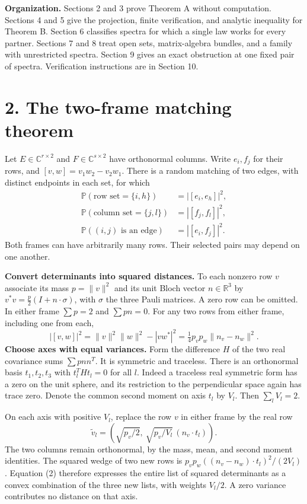 \documentclass[11pt]{article}
\newcommand{\heading}[1]{\section*{\color{ink}#1}}
\newcommand{\C}{\mathbb C}\newcommand{\R}{\mathbb R}\newcommand{\E}{\mathbb E}\newcommand{\pr}{\mathbb P}
\begin{document}
\par\textbf{Organization.} Sections 2 and 3 prove Theorem A without computation. Sections 4 and 5 give the projection, finite verification, and analytic inequality for Theorem B. Section 6 classifies spectra for which a single law works for every partner. Sections 7 and 8 treat open sets, matrix-algebra bundles, and a family with unrestricted spectra. Section 9 gives an exact obstruction at one fixed pair of spectra. Verification instructions are in Section 10.
\newpage
\heading{2. The two-frame matching theorem}
Let $E\in\C^{r\times2}$ and $F\in\C^{s\times2}$ have orthonormal columns. Write $e_i,f_j$ for their rows, and $[v,w]=v_1w_2-v_2w_1$. There is a random matching of two edges, with distinct endpoints in each set, for which
\[
 \begin{aligned}
 \pr(\text{row set}=\{i,h\})&=|[e_i,e_h]|^2,\\
 \pr(\text{column set}=\{j,l\})&=|[f_j,f_l]|^2,\\
 \pr((i,j)\text{ is an edge})&=|[e_i,f_j]|^2 .
 \end{aligned}                                                   \tag{1}
\]
Both frames can have arbitrarily many rows. Their selected pairs may depend on one another.
\par\textbf{Convert determinants into squared distances.} To each nonzero row $v$ associate its mass $p=\|v\|^2$ and its unit Bloch vector $n\in\R^3$ by $v^*v=\frac p2(I+n\cdot\sigma)$, with $\sigma$ the three Pauli matrices. A zero row can be omitted. In either frame $\sum p=2$ and $\sum pn=0$. For any two rows from either frame, including one from each,
\[
 |[v,w]|^2=\|v\|^2\|w\|^2-|vw^*|^2=\tfrac14 p_v p_w\|n_v-n_w\|^2. \tag{2}
\]
\textbf{Choose axes with equal variances.} Form the difference $H$ of the two real covariance sums $\sum p nn^T$. It is symmetric and traceless. There is an orthonormal basis $t_1,t_2,t_3$ with $t_l^THt_l=0$ for all $l$. Indeed a traceless real symmetric form has a zero on the unit sphere, and its restriction to the perpendicular space again has trace zero. Denote the common second moment on axis $t_l$ by $V_l$. Then $\sum_l V_l=2$.
\par On each axis with positive $V_l$, replace the row $v$ in either frame by the real row
\[
 \widetilde v_l=\left(\sqrt{p_v/2},\ \sqrt{p_v/V_l}\,(n_v\cdot t_l)\right).
\]
The two columns remain orthonormal, by the mass, mean, and second moment identities. The squared wedge of two new rows is $p_vp_w((n_v-n_w)\cdot t_l)^2/(2V_l)$. Equation (2) therefore expresses the entire list of squared determinants as a convex combination of the three new lists, with weights $V_l/2$. A zero variance contributes no distance on that axis.
\end{document}
